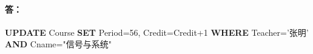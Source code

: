 \paragraph{答：}
\textbf{UPDATE} Course \textbf{SET} Period=56, Credit=Credit+1 \textbf{WHERE} Teacher='张明' \textbf{AND} Cname="信号与系统"